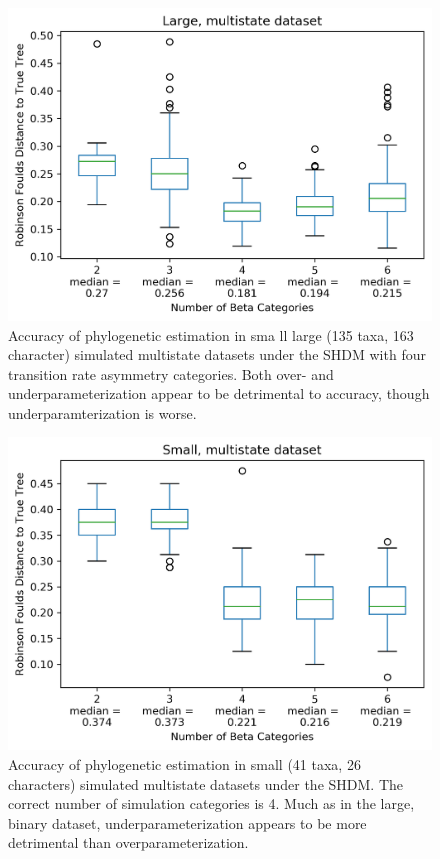 \documentclass[]{sysbio}
\begin{document}
\begin{figure}
  \caption{Accuracy of phylogenetic estimation in sma	ll large (135 taxa, 163 character) simulated multistate datasets under the SHDM with four transition rate asymmetry categories. Both over- and underparameterization appear to be detrimental to accuracy, though underparamterization is worse.} 
    \includegraphics{fig/LargeMultiState}
\end{figure} 

\begin{figure}
  \caption{Accuracy of phylogenetic estimation in small (41 taxa, 26 characters) simulated multistate datasets under the SHDM. The correct number of simulation categories is 4. Much as in the large, binary dataset, underparameterization appears to be more detrimental than overparameterization.} 
    \includegraphics{fig/SmallMS}
\end{figure} 
\end{document}
